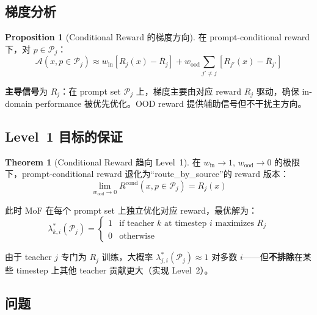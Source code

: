\documentclass[11pt,a4paper]{article}
\newcommand{\adv}{\mathcal{A}}
\newcommand{\reward}{R}
\theoremstyle{definition}
\newtheorem{proposition}{Proposition}
\newtheorem{theorem}{Theorem}
\begin{document}
\subsection{梯度分析}

\begin{proposition}[Conditional Reward 的梯度方向]
在 prompt-conditional reward 下，对 $p \in \mathcal{P}_j$：
\begin{equation}
\adv(x, p \in \mathcal{P}_j) \approx w_{\mathrm{in}}\left[R_j(x) - \bar{R}_j\right] + w_{\mathrm{ood}}\sum_{j' \neq j}\left[R_{j'}(x) - \bar{R}_{j'}\right]
\end{equation}

\textbf{主导信号}为 $R_j$：在 prompt set $\mathcal{P}_j$ 上，梯度主要由对应 reward $R_j$ 驱动，确保 in-domain performance 被优先优化。OOD reward 提供辅助信号但不干扰主方向。
\end{proposition}

\subsection{Level~1 目标的保证}

\begin{theorem}[Conditional Reward 趋向 Level~1]
\label{thm:level1}
在 $w_{\mathrm{in}} \to 1$, $w_{\mathrm{ood}} \to 0$ 的极限下，prompt-conditional reward 退化为``route\_by\_source''的 reward 版本：
\begin{equation}
\lim_{w_{\mathrm{ood}} \to 0} \reward^{\mathrm{cond}}(x, p \in \mathcal{P}_j) = R_j(x)
\end{equation}

此时 MoF 在每个 prompt set 上独立优化对应 reward，最优解为：
\begin{equation}
\lambda^*_{k,i}(\mathcal{P}_j) = \begin{cases} 1 & \text{if teacher $k$ at timestep $i$ maximizes $R_j$} \\ 0 & \text{otherwise} \end{cases}
\end{equation}

由于 teacher $j$ 专门为 $R_j$ 训练，大概率 $\lambda^*_{j,i}(\mathcal{P}_j) \approx 1$ 对多数 $i$——但\textbf{不排除}在某些 timestep 上其他 teacher 贡献更大（实现 Level~2）。
\end{theorem}

\subsection{问题}
\end{document}
